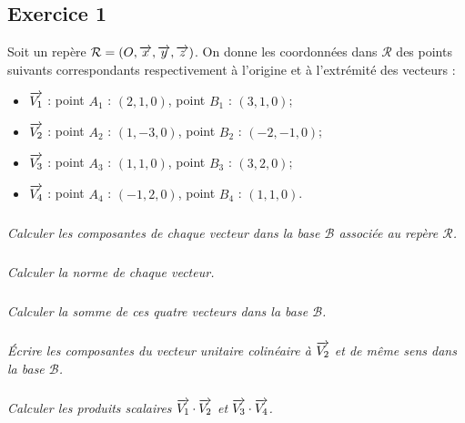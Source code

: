 \documentclass[11pt,oneside]{article}
\begin{document}
\subsection*{Exercice 1}
Soit un repère $\mathcal{R}=\left(O,\overrightarrow{x},\overrightarrow{y},\overrightarrow{z} \right)$. On donne les coordonnées dans $\mathcal{R}$ des points suivants correspondants respectivement à l'origine et à l'extrémité des vecteurs :
\begin{itemize}
\item $\overrightarrow{V_1}$ : point $A_1$ : $(2,1,0)$, point $B_1$ : $(3,1,0)$;
\item $\overrightarrow{V_2}$ : point $A_2$ : $(1,-3,0)$, point $B_2$ : $(-2,-1,0)$;
\item $\overrightarrow{V_3}$ : point $A_3$ : $(1,1,0)$, point $B_3$ : $(3,2,0)$;
\item $\overrightarrow{V_4}$ : point $A_4$ : $(-1,2,0)$, point $B_4$ : $(1,1,0)$.
\end{itemize}

\subparagraph{}
\textit{Calculer les composantes de chaque vecteur dans la base $\mathcal{B}$ associée au repère $\mathcal{R}$.}




\subparagraph{}
\textit{Calculer la norme de chaque vecteur.}


\subparagraph{}
\textit{Calculer la somme de ces quatre vecteurs dans la base $\mathcal{B}$.}


\subparagraph{}
\textit{Écrire les composantes du vecteur unitaire colinéaire à $\overrightarrow{V_2}$ et de même sens dans la base $\mathcal{B}$. }


\subparagraph{}
\textit{Calculer les produits scalaires $\overrightarrow{V_1}\cdot \overrightarrow{V_2}$ et  $\overrightarrow{V_3}\cdot \overrightarrow{V_4}$.}

\end{document}

